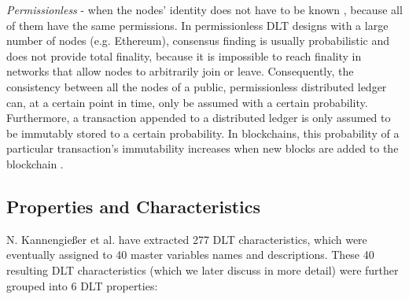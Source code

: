 \textit{Permissionless} - when the nodes’ identity does not have to be known \cite{dlt_public}, because all of them have the same permissions. In permissionless DLT designs with a large number of nodes (e.g. Ethereum), consensus finding is usually probabilistic and does not provide total finality, because it is impossible to reach finality in networks that allow nodes to arbitrarily join or leave. Consequently, the consistency between all the nodes of a public, permissionless distributed ledger can, at a certain point in time, only be assumed with a certain probability. Furthermore, a transaction appended to a distributed ledger is only assumed to be immutably stored to a certain probability. In blockchains, this probability of a particular transaction’s immutability increases when new blocks are added to the blockchain \cite{bitcoin,dlt_1}. 


\subsection{Properties and Characteristics}
\label{ssec:propertiesandcharacteristics}

N. Kannengießer et al. \cite{dlt_4} have extracted 277 DLT characteristics, which were eventually assigned to 40 master variables names and descriptions. These 40 resulting DLT characteristics (which we later discuss in more detail) were further grouped into 6 DLT properties:


